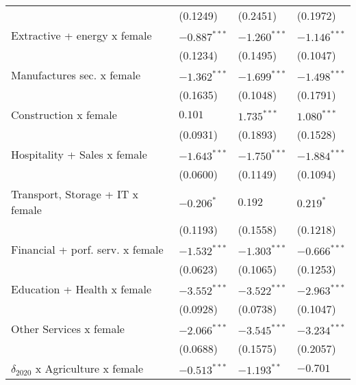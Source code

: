 \begin{tabular}{llll}
                                                   &        (0.1249) &        (0.2451) &        (0.1972) \\
Extractive + energy x female                       &  $-0.887^{***}$ &  $-1.260^{***}$ &  $-1.146^{***}$ \\
                                                   &        (0.1234) &        (0.1495) &        (0.1047) \\
Manufactures sec. x female                         &  $-1.362^{***}$ &  $-1.699^{***}$ &  $-1.498^{***}$ \\
                                                   &        (0.1635) &        (0.1048) &        (0.1791) \\
Construction x female                              &         $0.101$ &   $1.735^{***}$ &   $1.080^{***}$ \\
                                                   &        (0.0931) &        (0.1893) &        (0.1528) \\
Hospitality + Sales x female                       &  $-1.643^{***}$ &  $-1.750^{***}$ &  $-1.884^{***}$ \\
                                                   &        (0.0600) &        (0.1149) &        (0.1094) \\
Transport, Storage + IT x female                   &      $-0.206^*$ &         $0.192$ &       $0.219^*$ \\
                                                   &        (0.1193) &        (0.1558) &        (0.1218) \\
Financial + porf. serv. x female                   &  $-1.532^{***}$ &  $-1.303^{***}$ &  $-0.666^{***}$ \\
                                                   &        (0.0623) &        (0.1065) &        (0.1253) \\
Education + Health x female                        &  $-3.552^{***}$ &  $-3.522^{***}$ &  $-2.963^{***}$ \\
                                                   &        (0.0928) &        (0.0738) &        (0.1047) \\
Other Services x female                            &  $-2.066^{***}$ &  $-3.545^{***}$ &  $-3.234^{***}$ \\
                                                   &        (0.0688) &        (0.1575) &        (0.2057) \\
$\delta_{2020}$ x Agriculture x female             &  $-0.513^{***}$ &   $-1.193^{**}$ &        $-0.701$ \\

\end{tabular}
